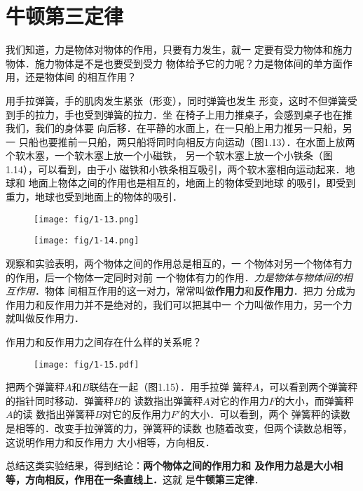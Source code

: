 \section{牛顿第三定律}
我们知道，力是物体对物体的作用，只要有力发生，就一
定要有受力物体和施力物体．施力物体是不是也要受到受力
物体给予它的力呢？力是物体间的单方面作用，还是物体间
的相互作用？

    用手拉弹簧，手的肌肉发生紧张（形变），同时弹簧也发生
形变，这时不但弹簧受到手的拉力，手也受到弹簧的拉力．坐
在椅子上用力推桌子，会感到桌子也在推我们，我们的身体要
向后移．在平静的水面上，在一只船上用力推另一只船，另一
只船也要推前一只船，两只船将同时向相反方向运动（图1.13）．在水面上放两个软木塞，一个软木塞上放一个小磁铁，
另一个软木塞上放一个小铁条（图1.14），可以看到，由于小
磁铁和小铁条相互吸引，两个软木塞相向运动起来．地球和
地面上物体之间的作用也是相互的，地面上的物体受到地球
的吸引，即受到重力，地球也受到地面上的物体的吸引．

\begin{figure}[htp]\centering
\texttt{[image: fig/1-13.png]}
\caption{}
\end{figure}

\begin{figure}[htp]\centering
\texttt{[image: fig/1-14.png]}
\caption{}
\end{figure}

观察和实验表明，两个物体之间的作用总是相互的，一
个物体对另一个物体有力的作用，后一个物体一定同时对前
一个物体有力的作用．\textit{力是物体与物体间的相互作用}．物体
间相互作用的这一对力，常常叫做\textbf{作用力}和\textbf{反作用力}．把力
分成为作用力和反作用力并不是绝对的，我们可以把其中一
个力叫做作用力，另一个力就叫做反作用力．

    作用力和反作用力之间存在什么样的关系呢？

\begin{figure}[htp]\centering
\texttt{[image: fig/1-15.pdf]}
\caption{}
\end{figure}

    把两个弹簧秤$A$和$B$联结在一起（图1.15）．用手拉弹
簧秤$A$，可以看到两个弹簧秤的指针同时移动．弹簧秤$B$的
读数指出弹簧秤$A$对它的作用力$F$的大小，而弹簧秤$A$的读
数指出弹簧秤$B$对它的反作用力$F'$的大小．可以看到，两个
弹簧秤的读数是相等的．改变手拉弹簧的力，弹簧秤的读数
也随着改变，但两个读数总相等，这说明作用力和反作用力
大小相等，方向相反．

    总结这类实验结果，得到结论：\textbf{两个物体之间的作用力和
及作用力总是大小相等，方向相反，作用在一条直线上．}这就
是\textbf{牛顿第三定律}．

